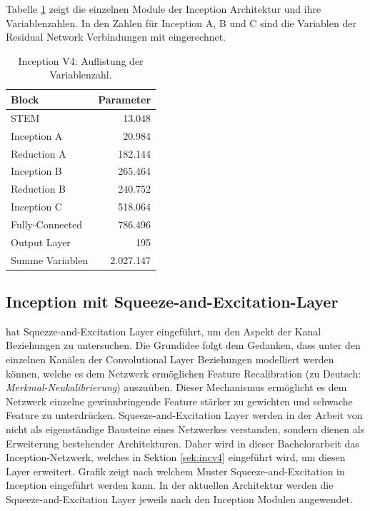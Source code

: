 Tabelle \ref{tb:var_inc4} zeigt die einzelnen Module der Inception Architektur und ihre Variablenzahlen. In den Zahlen f\"ur Inception A, B und C sind die Variablen der Residual Network Verbindungen mit eingerechnet. 

\begin{table}
\centering
\caption{Inception V4: Auflistung der Variablenzahl.}
\begin{tabular}{@{}lr@{}}
\hline
Block & Parameter\\
\hline
STEM &  13.048\\
Inception A & 20.984\\
Reduction A & 182.144\\
Inception B & 265.464\\
Reduction B & 240.752\\
Inception C & 518.064\\
Fully-Connected & 786.496\\
Output Layer & 195\\
\hline
Summe Variablen & 2.027.147\\
\hline
\end{tabular}
\label{tb:var_inc4}
\end{table}

\subsection{Inception mit Squeeze-and-Excitation-Layer}

\textcite{DBLP:journals/corr/abs-1709-01507} hat Squezze-and-Excitation Layer eingeführt, um den Aspekt der Kanal Beziehungen zu untersuchen. Die Grundidee folgt dem Gedanken, dass unter den einzelnen Kanälen der Convolutional Layer Beziehungen modelliert werden können, welche es dem Netzwerk ermöglichen Feature Recalibration (zu Deutsch: \textit{Merkmal-Neukalibrierung}) auszuüben. Dieser Mechanismus ermöglicht es dem Netzwerk einzelne gewinnbringende Feature stärker zu gewichten und schwache Feature zu unterdrücken. Squeeze-and-Excitation Layer werden in der Arbeit von \textcite{DBLP:journals/corr/abs-1709-01507} nicht als eigenständige Bausteine eines Netzwerkes verstanden, sondern dienen als Erweiterung bestehender Architekturen. Daher wird in dieser Bachelorarbeit das Inception-Netzwerk, welches in Sektion \ref{sek:incv4} eingeführt wird, um diesen Layer erweitert. Grafik zeigt nach welchem Muster Squeeze-and-Excitation in Inception eingeführt werden kann. In der aktuellen Architektur werden die Squeeze-and-Excitation Layer jeweils nach den Inception Modulen angewendet. 

